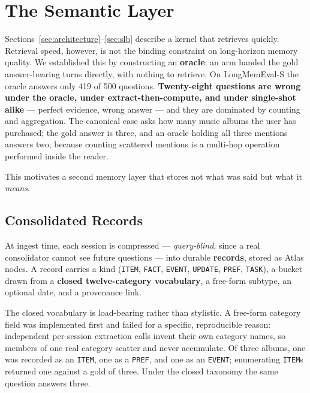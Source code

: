 
\section{The Semantic Layer}
\label{sec:semantic}

Sections~\ref{sec:architecture}--\ref{sec:slb} describe a kernel that retrieves quickly. Retrieval speed, however, is not the binding constraint on long-horizon memory quality. We established this by constructing an \textbf{oracle}: an arm handed the gold answer-bearing turns directly, with nothing to retrieve. On LongMemEval-S the oracle answers only 419 of 500 questions. \textbf{Twenty-eight questions are wrong under the oracle, under extract-then-compute, and under single-shot alike} --- perfect evidence, wrong answer --- and they are dominated by counting and aggregation. The canonical case asks how many music albums the user has purchased; the gold answer is three, and an oracle holding all three mentions answers two, because counting scattered mentions is a multi-hop operation performed inside the reader.

This motivates a second memory layer that stores not what was said but what it \emph{means}.

\subsection{Consolidated Records}

At ingest time, each session is compressed --- \emph{query-blind}, since a real consolidator cannot see future questions --- into durable \textbf{records}, stored as Atlas nodes. A record carries a kind (\texttt{ITEM}, \texttt{FACT}, \texttt{EVENT}, \texttt{UPDATE}, \texttt{PREF}, \texttt{TASK}), a bucket drawn from a \textbf{closed twelve-category vocabulary}, a free-form subtype, an optional date, and a provenance link.

The closed vocabulary is load-bearing rather than stylistic. A free-form category field was implemented first and failed for a specific, reproducible reason: independent per-session extraction calls invent their own category names, so members of one real category scatter and never accumulate. Of three albums, one was recorded as an \texttt{ITEM}, one as a \texttt{PREF}, and one as an \texttt{EVENT}; enumerating \texttt{ITEM}s returned one against a gold of three. Under the closed taxonomy the same question answers three.

